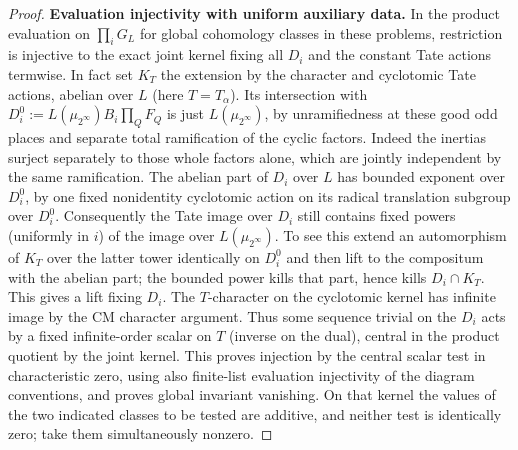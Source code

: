 \begin{proof}
\par\smallskip\noindent\textbf{Evaluation injectivity with uniform auxiliary data.}\enspace
In the product evaluation on \(\prod_i G_L\) for global cohomology classes in these problems,
restriction is injective to the exact joint kernel fixing all \(D_i\) and the constant Tate
actions termwise. In fact set \(K_T\) the extension by the character and cyclotomic Tate
actions, abelian over \(L\) (here \(T=T_\alpha\)). Its intersection with
\(D_i^0:=L(\mu_{2^\infty}) B_i\prod_Q F_Q\) is just \(L(\mu_{2^\infty})\), by unramifiedness
at these good odd places and separate total ramification of the cyclic factors. Indeed the
inertias surject separately to those whole factors alone, which are jointly independent by the
same ramification. The abelian part of \(D_i\) over \(L\) has bounded exponent over \(D_i^0\),
by one fixed nonidentity cyclotomic action on its radical translation subgroup over \(D_i^0\).
Consequently the Tate image over \(D_i\) still contains fixed powers (uniformly in \(i\)) of
the image over \(L(\mu_{2^\infty})\). To see this extend an automorphism of \(K_T\) over the
latter tower identically on \(D_i^0\) and then lift to the compositum with the abelian part;
the bounded power kills that part, hence kills \(D_i\cap K_T\). This gives a lift fixing
\(D_i\). The \(T\)-character on the cyclotomic kernel has infinite image by the CM character
argument. Thus some sequence trivial on the \(D_i\) acts by a fixed infinite-order scalar on
\(T\) (inverse on the dual), central in the product quotient by the joint kernel. This proves
injection by the central scalar test in characteristic zero, using also finite-list evaluation
injectivity of the diagram conventions, and proves global invariant vanishing. On that kernel
the values of the two indicated classes to be tested are additive, and neither test is
identically zero; take them simultaneously nonzero.


\end{proof}
